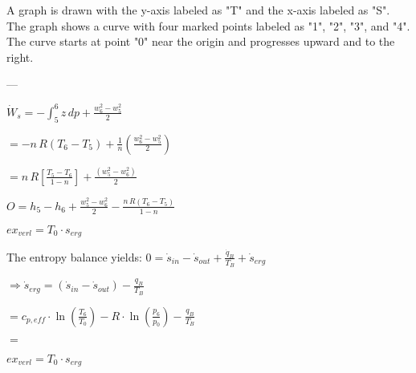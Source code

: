 A graph is drawn with the y-axis labeled as "T" and the x-axis labeled as "S". The graph shows a curve with four marked points labeled as "1", "2", "3", and "4". The curve starts at point "0" near the origin and progresses upward and to the right.

---

\( \dot{W}_s = - \int_5^6 z \, dp + \frac{w_6^2 - w_5^2}{2} \)  

\( = - n \, R \left( T_6 - T_5 \right) + \frac{1}{n} \left( \frac{w_6^2 - w_5^2}{2} \right) \)  

\( = n \, R \left[ \frac{T_5 - T_6}{1 - n} \right] + \frac{\left( w_5^2 - w_6^2 \right)}{2} \)  

\( O = h_5 - h_6 + \frac{w_5^2 - w_6^2}{2} - \frac{n \, R \left( T_6 - T_5 \right)}{1 - n} \)

\( ex_{verl} = T_0 \cdot s_{erg} \)  

The entropy balance yields:  
\( 0 = \dot{s}_{in} - \dot{s}_{out} + \frac{\dot{q}_B}{T_B} + \dot{s}_{erg} \)  

\( \Rightarrow \dot{s}_{erg} = (\dot{s}_{in} - \dot{s}_{out}) - \frac{q_B}{T_B} \)  

\( = c_{p,eff} \cdot \ln \left( \frac{T_6}{T_0} \right) - R \cdot \ln \left( \frac{p_6}{p_0} \right) - \frac{q_B}{T_B} \)  

\( = \)  

\( ex_{verl} = T_0 \cdot s_{erg} \)